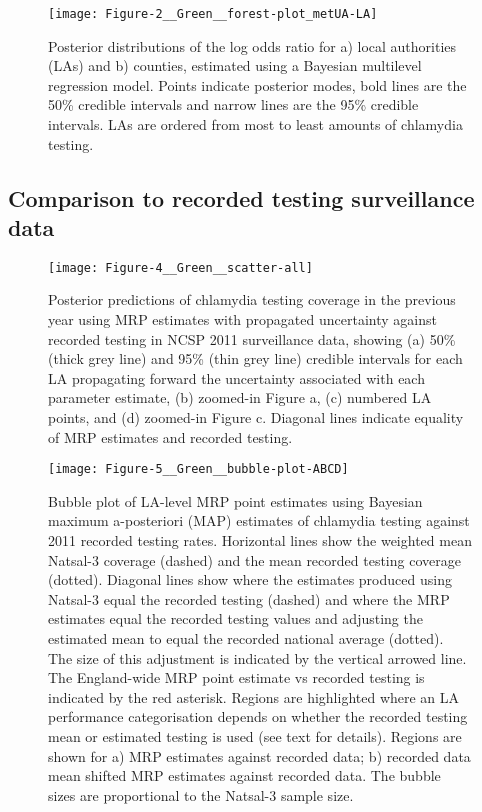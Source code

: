 \documentclass[fleqn,10pt]{wlscirep}
\begin{document}
\begin{figure}[!ht]
\centering
\texttt{[image: Figure-2\_\_Green\_\_forest-plot\_metUA-LA]}
\caption{Posterior distributions of the log odds ratio for a) local authorities (LAs) and b) counties, estimated using a
Bayesian multilevel regression model. Points indicate posterior modes, bold lines are the 50\% credible
intervals and narrow lines are the 95\% credible intervals. LAs are ordered from most to least amounts of
chlamydia testing.}
\label{fig:forest}
\end{figure}

\subsection*{Comparison to recorded testing surveillance data}

\begin{figure}[!ht]
\centering
\texttt{[image: Figure-4\_\_Green\_\_scatter-all]}
\caption{Posterior predictions of chlamydia testing coverage in the previous year using MRP estimates with propagated uncertainty against recorded testing in NCSP 2011 surveillance data, showing (a) 50\% (thick grey line) and 95\% (thin grey line) credible intervals for each LA propagating forward the uncertainty associated with each parameter estimate, (b) zoomed-in Figure a, (c) numbered LA points, and (d) zoomed-in Figure c. Diagonal lines indicate equality of MRP estimates and recorded testing.}
\label{fig:scatterall}
\end{figure}

\begin{figure}[!ht]
\centering
\texttt{[image: Figure-5\_\_Green\_\_bubble-plot-ABCD]}
\caption{Bubble plot of LA-level MRP point estimates using Bayesian maximum a-posteriori (MAP) estimates of chlamydia testing against 2011 recorded testing rates. Horizontal lines show the weighted mean Natsal-3 coverage (dashed) and the mean recorded testing coverage (dotted). Diagonal lines show where the estimates produced using Natsal-3 equal the recorded testing (dashed) and where the MRP estimates equal the recorded testing values and adjusting the estimated mean to equal the recorded national average (dotted). The size of this adjustment is indicated by the vertical arrowed line. The England-wide MRP point estimate vs recorded testing is indicated by the red asterisk. Regions are highlighted where an LA performance categorisation depends on whether the recorded testing mean or estimated testing is used (see text for details). Regions are shown for a) MRP estimates against recorded data; b) recorded data mean shifted MRP estimates against recorded data. The bubble sizes are proportional to the Natsal-3 sample size.}
\label{fig:bubble}
\end{figure}
\end{document}
